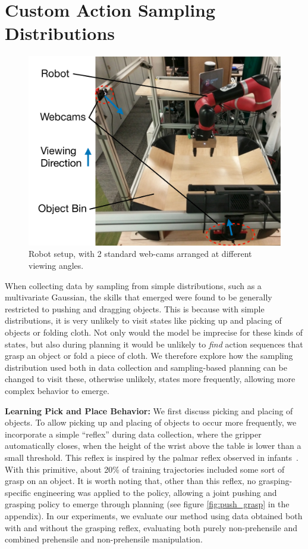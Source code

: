 \section{Custom Action Sampling Distributions}

\begin{figure}
	\centering
	\includegraphics[width=0.45\columnwidth]{images_general/robot_setup_scheme.pdf}
\caption{\small{Robot setup, with 2 standard web-cams arranged at different viewing angles.}}	\label{fig:robot_setup}
\end{figure}

\label{sec:system}
When collecting data by sampling from simple distributions, such as a multivariate Gaussian, the skills that emerged were found to be generally restricted to pushing and dragging objects. This is because with simple distributions, it is very unlikely to visit states like picking up and placing of objects or folding cloth. Not only would the model be imprecise for these kinds of states, but also during planning it would be unlikely to \emph{find} action sequences that grasp an object or fold a piece of cloth. 
We therefore explore how the sampling distribution used both in data collection and sampling-based planning can be changed to visit these, otherwise unlikely, states more frequently, allowing more complex behavior to emerge. 

\noindent \textbf{Learning Pick and Place Behavior:}
We first discuss picking and placing of objects. To allow picking up and placing of objects to occur more frequently, we incorporate a simple ``reflex'' during data collection, where the gripper automatically closes, when the height of the wrist above the table is lower than a small threshold. This reflex is inspired by the palmar reflex observed in infants~\cite{grasping_fetal}. With this primitive, about 20\% of training trajectories included some sort of grasp on an object. It is worth noting that, other than this reflex, no grasping-specific engineering was applied to the policy, allowing a joint pushing and grasping policy to emerge through planning (see figure \ref{fig:push_grasp} in the appendix). In our experiments, we evaluate our method using data obtained both with and without the grasping reflex, evaluating both purely non-prehensile and combined prehensile and non-prehensile manipulation.

